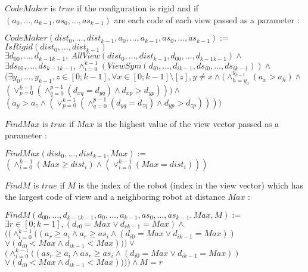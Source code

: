 \documentclass{article}
\begin{document}
$CodeMaker$ is $true$ if the configuration is rigid and if $(a_{0}, \ldots , a_{k-1}, as_{0}, \ldots , as_{k-1})$ are each code of each view passed as a parameter :

\begin{center}

$CodeMaker(dist_{0}, \ldots ,dist_{k-1}, a_{0}, \ldots , a_{k-1}, as_{0}, \ldots , as_{k-1}):=$\\
$IsRigid(dist_{0}, \ldots ,dist_{k-1})$\\
$\exists d_{00}, \ldots ,d_{k-1k-1},\ AllView(dist_{0}, \ldots ,dist_{k-1}, d_{00}, \ldots ,d_{k-1k-1})\land$\\
$\exists ds_{00}, \ldots ,ds_{k-1k-1}, \land_{i=0}^{k-1} (ViewSym(d_{i0}, \ldots , d_{ik-1}, ds_{i0}, \ldots , ds_{ik-1}))\land$\\
$(\exists y_{0}, \ldots , y_{k-1},z \in [0;k-1], \forall x \in [0;k-1] \setminus [z], y\not=x \land
(\land_{h=y_{0}}^{y_{k-1}}(a_{x} > a_{h}) \land $\\
$(\lor_{p=0}^{k-1}(\land_{q=0}^{p-1}(d_{xq} = d_{yq}) \land d_{xp} > d_{yp} ) ) )\land $\\
$(a_{y} > a_{z} \land (\lor_{p=0}^{k-1}(\land_{q=0}^{p-1}(d_{yq} = d_{zq}) \land d_{yp} > d_{zp} ) ))
)$\\
\end{center}

$FindMax$ is $true$ if $Max$ is the highest value of the view vector passed as a parameter :

\begin{center}

$FindMax(dist_{0}, \ldots ,dist_{k-1}, Max):=$\\
$(\land_{i=0}^{k-1} (Max \geq dist_{i}) \land (\lor_{i=0}^{k-1} (Max = dist_{i})))$
\end{center}

$FindM$ is $true$ if $M$ is the index of the robot (index in the view vector) which has the largest code of view and a neighboring robot at distance $Max$ :

\begin{center}

$FindM(d_{00}, \ldots ,d_{k-1k-1}, a_{0}, \ldots , a_{k-1}, as_{0}, \ldots , as_{k-1}, Max, M):=$\\
$\exists r \in [0; k-1], (d_{r0} = Max \lor d_{rk-1} = Max) \land $\\
$((\land_{i=0}^{k-1} ((a_{r} \geq a_i \land a_{r} \geq as_i \land (d_{i0} = Max \lor d_{ik-1} = Max))$\\
$\lor (d_{i0} < Max \land d_{ik-1} < Max))) \lor$\\
$(\land_{i=0}^{k-1} ((as_{r} \geq a_i \land as_{r} \geq as_i \land (d_{i0} = Max \lor d_{ik-1} = Max))$\\
$\lor (d_{i0} < Max \land d_{ik-1} < Max)))) \land M = r $
\end{center}
\end{document}
